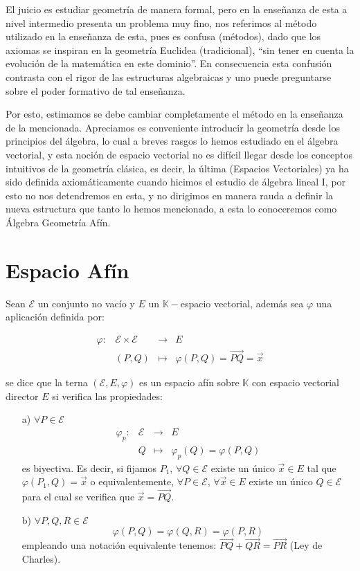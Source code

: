 \documentclass[11pt,a4paper,twoside]{book}\usepackage[]{graphicx}\usepackage[]{color}
\newcommand{\m}[1]{\mathbb{#1}}
\newcommand{\C}[1]{\mathcal{#1}}
\newcommand{\fu}[5]{\begin{array}{rccl} #1:&#2&\to&#3\\ &#4&\mapsto&#5\end{array}}
\newcommand{\ora}[1]{\overrightarrow{#1}}
\begin{document}
El juicio es estudiar geometría de manera formal, pero en la enseñanza de esta a nivel intermedio presenta un problema muy fino, nos referimos al método utilizado en la enseñanza de esta, pues es confusa (métodos), dado que los axiomas se inspiran en la geometría Euclidea (tradicional), ``sin tener en cuenta la evolución de la matemática en este dominio''. En consecuencia esta confusión contrasta con el rigor de las estructuras algebraicas y uno puede preguntarse sobre el poder formativo de tal enseñanza.\newline %

Por esto, estimamos se debe cambiar completamente el método en la enseñanza de la mencionada. Apreciamos es conveniente introducir la geometría desde los principios del álgebra, lo cual a breves rasgos lo hemos estudiado en el álgebra vectorial, y esta noción de espacio vectorial no es difícil llegar desde los conceptos intuitivos de la geometría clásica, es decir, la última (Espacios Vectoriales) ya ha sido definida axiomáticamente cuando hicimos el estudio de álgebra lineal I, por esto no nos detendremos en esta, y no dirigimos en manera rauda a definir la nueva estructura que tanto lo hemos mencionado, a esta lo conoceremos como Álgebra Geometría Afín.

\section{Espacio Afín}

\begin{definition}
Sean $\C{E}$ un conjunto no vacío y $E$ un $\m{K}-$espacio vectorial, además sea $\varphi$ una aplicación definida por:

\[\fu{\varphi}{\C{E}\times\C{E}}{E}{(P,Q)}{\varphi(P,Q)=\ora{PQ}=\ora{x}}\]

se dice que la terna $(\C{E}, E, \varphi)$ es un espacio afín sobre $\m{K}$ con espacio vectorial director $E$ si verifica las propiedades:
\begin{itemize}
      \item [a)] $\forall P\in \C{E}$
      \[\fu{\varphi_p}{\C{E}}{E}{Q}{\varphi_p(Q)=\varphi(P,Q)}\]
      es biyectiva. Es decir, si fijamos $P_1$, $\forall Q\in \C{E}$ existe un único $\ora{x}\in E$ tal que $\varphi(P_1, Q)=\ora{x}$ o equivalentemente, $\forall P\in \C{E}$, $\forall \ora{x}\in E$ existe un único $Q\in \C{E}$ para el cual se verifica que $\ora{x}=\ora{PQ}$.
      \item [b)] $\forall P, Q, R\in \C{E}$
      \[\varphi(P,Q)=\varphi(Q,R)=\varphi(P,R)\]
      empleando una notación equivalente tenemos: $\ora{PQ}+\ora{QR}=\ora{PR}$ (Ley de Charles).
\end{itemize}
\end{definition}
\end{document}
